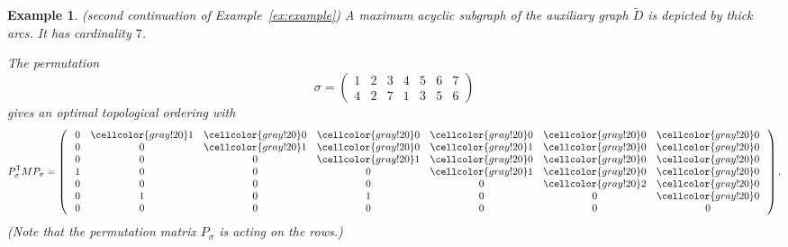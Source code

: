 \documentclass{amsart}
\newtheorem{example}[defin]{Example}
\begin{document}
\begin{example} (second continuation of Example~\ref{ex:example}) A
  maximum acyclic subgraph of the auxiliary graph $\tilde{D}$
  is depicted by thick arcs. It has cardinality $7$. 
\begin{center}
\end{center}
The permutation
\[
  \sigma =
  \begin{pmatrix}
1 & 2 & 3 & 4 & 5 & 6 & 7 \\
4 & 2 & 7 & 1 & 3 & 5 & 6
\end{pmatrix}
\]
gives an optimal topological ordering with
\[
  P_\sigma^{\sf T} M P_\sigma =
\left(\;
  \begin{array}{ccccccccc}
    0 & \cellcolor{gray!20} 1 & \cellcolor{gray!20} 0 & \cellcolor{gray!20} 0 & \cellcolor{gray!20} 0 & \cellcolor{gray!20} 0 & \cellcolor{gray!20} 0 \\
    0 & 0 & \cellcolor{gray!20}  1 & \cellcolor{gray!20}  0 & \cellcolor{gray!20} 1 & \cellcolor{gray!20} 0 & \cellcolor{gray!20} 0 \\
    0 & 0 & 0 & \cellcolor{gray!20} 1 & \cellcolor{gray!20} 0 & \cellcolor{gray!20} 0 & \cellcolor{gray!20}  0 \\
    1 & 0 & 0 & 0 & \cellcolor{gray!20} 1 & \cellcolor{gray!20} 0 & \cellcolor{gray!20} 0 \\
    0 & 0 & 0 & 0 & 0 & \cellcolor{gray!20} 2 & \cellcolor{gray!20} 0 \\
    0 & 1 & 0 & 1 & 0 & 0 & \cellcolor{gray!20} 0 \\
    0 & 0 & 0 & 0 & 0 & 0 & 0 \\
\end{array}
\;\right).
\]
(Note that the permutation matrix $P_\sigma$ is acting on the rows.)
\end{example}
\end{document}
